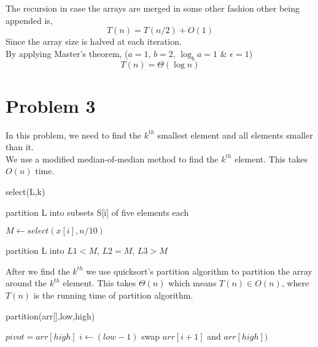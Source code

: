 \documentclass[12pt,letterpaper]{article}
\begin{document}
  The recursion in case the arrays are merged in some other fashion other being appended is,
  $$T(n) = T(n/2) + O(1)$$
  Since the array size is halved at each iteration.\\

  By applying Master's theorem, ($a=1$, $b=2$, $\log_b a = 1$ \& $\epsilon = 1$) 
  $$T(n) = \Theta (\log n)$$
  
\section*{Problem 3}
  In this problem, we need to find the $k^{th}$ smallest element and all elements smaller than it.\\
  
  We use a modified median-of-median method to find the $k^{th}$ element. This takes $O(n)$ time. 
  
  select(L,k)\\
  \begin{algorithm}

    partition L into subsets S[i] of five elements each\;

    $M \gets select({x[i]}, n/10)$\;

    partition L into $L1<M$, $L2=M$, $L3>M$\;

  
  \end{algorithm}
  
  After we find the $k^{th}$ we use quicksort's partition algorithm to partition the array around the $k^{th}$ element. This takes $\Theta(n)$ which means $T(n) \in O(n)$, where $T(n)$ is the running time of partition algorithm.
  
  \newpage
  
  partition(arr[],low,high)\\
  
  \begin{algorithm}
  $pivot = arr[high]$\;
  $i \gets (low-1)$\;
  swap $arr[i + 1]$ and $arr[high])$\;
  \;
  \end{algorithm}
 \\
 
\end{document}
